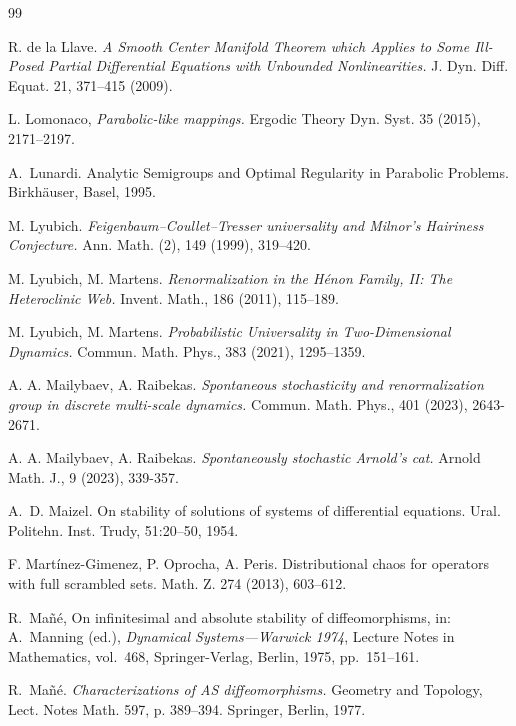 \documentclass[12pt]{article}
\theoremstyle{definition}
\begin{document}
\begin{thebibliography}{99}
{
R. de la Llave. \textit{A Smooth Center Manifold Theorem which Applies to Some Ill-Posed Partial Differential Equations with Unbounded Nonlinearities.} J. Dyn. Diff. Equat. 21, 371–415 (2009). %

L. Lomonaco, \textit{Parabolic-like mappings.} Ergodic Theory Dyn. Syst. 35 (2015), 2171–2197. 

A.~Lunardi.
\newblock Analytic Semigroups and Optimal Regularity in Parabolic Problems.
\newblock Birkhäuser, Basel, 1995.

M. Lyubich. \textit{Feigenbaum–Coullet–Tresser universality and Milnor’s Hairiness Conjecture.} Ann. Math. (2), 149 (1999), 319–420. 

M. Lyubich, M. Martens. \textit{Renormalization in the Hénon Family, II: The Heteroclinic Web.} Invent. Math., 186 (2011), 115–189. 

M. Lyubich, M. Martens. \textit{Probabilistic Universality in Two-Dimensional Dynamics.} Commun. Math. Phys., 383 (2021), 1295–1359.

A. A. Mailybaev, A. Raibekas. \textit{Spontaneous stochasticity and renormalization group in discrete multi-scale dynamics.} 	Commun. Math. Phys., 401 (2023), 2643-2671.

A. A. Mailybaev, A. Raibekas. \textit{Spontaneously stochastic Arnold’s cat.}
Arnold Math. J., 9 (2023), 339-357.

A.~D. Maizel.
\newblock On stability of solutions of systems of differential equations.
\newblock Ural. Politehn. Inst. Trudy, 51:20--50, 1954.

F. Martínez-Gimenez, P. Oprocha, A. Peris. Distributional chaos for operators with full scrambled sets. Math. Z. 274 (2013), 603–612.

R.~Ma\~n\'e,
\newblock On infinitesimal and absolute stability of diffeomorphisms,
\newblock in: A.~Manning (ed.), \emph{Dynamical Systems---Warwick 1974},
Lecture Notes in Mathematics, vol.~468,
Springer-Verlag, Berlin, 1975, pp.~151--161.

R.~Ma\~{n}\'{e}.
\newblock \textit{Characterizations of {AS} diffeomorphisms.}
\newblock Geometry and Topology, Lect. Notes Math. 597, p. 389--394. Springer, Berlin, 1977.

}
\end{thebibliography}
\end{document}
